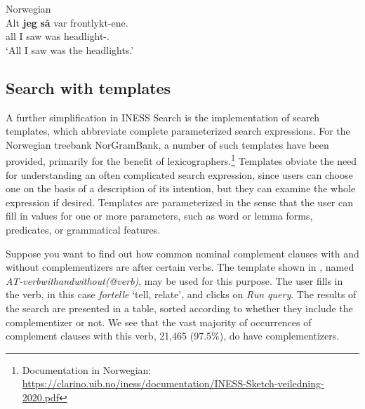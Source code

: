 \documentclass[output=paper,hidelinks]{langscibook}
\begin{document}
\ea Norwegian\\
\gll Alt \textbf{jeg} \textbf{så} var frontlykt-ene.\\  
     all I saw was {headlight-\DEF.\PL}\\ 
\glt `All I saw was the headlights.'
\label{ex:alt}
\z

\subsection{Search with templates}\label{templates}

A further simplification in INESS Search is the implementation of search templates, which abbreviate complete parameterized search expressions.
For the Norwegian treebank NorGramBank, a number of such templates have been provided, primarily for the benefit of lexicographers.\footnote{Documentation in Norwegian:
\url{https://clarino.uib.no/iness/documentation/INESS-Sketch-veiledning-2020.pdf}}
Templates obviate the need for understanding an often complicated search expression, since users can choose one on the basis of a description of its intention, but they can examine the whole expression if desired.
Templates are parameterized in the sense that the user can fill in values for one or more parameters, such as word or lemma forms, predicates, or grammatical features.

Suppose you want to find out how common nominal complement clauses with and without complementizers are after certain verbs.
The template shown in , named \textit{AT-verbwithandwithout(@verb)}, may be used for this purpose.
The user fills in the verb, in this case \textit{fortelle} `tell, relate', and clicks on \textit{Run query}.
The results of the search are presented in a table, sorted according to whether they include the complementizer or not.
We see that the vast majority of occurrences of complement clauses with this verb, 21,465 (97.5\%), do have complementizers.
\end{document}

